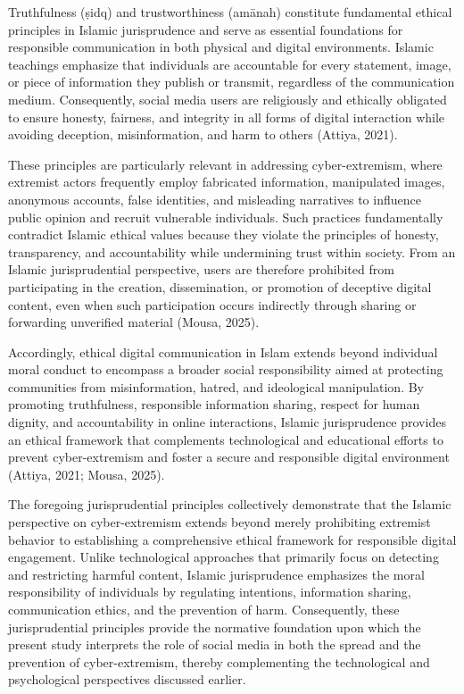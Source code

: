 \documentclass[10pt]{NSP1}
\begin{document}
\par\medskip{}\smallskip

Truthfulness (ṣidq) and trustworthiness (amānah) constitute fundamental ethical principles in Islamic jurisprudence and serve as essential foundations for responsible communication in both physical and digital environments. Islamic teachings emphasize that individuals are accountable for every statement, image, or piece of information they publish or transmit, regardless of the communication medium. Consequently, social media users are religiously and ethically obligated to ensure honesty, fairness, and integrity in all forms of digital interaction while avoiding deception, misinformation, and harm to others (Attiya, 2021).

These principles are particularly relevant in addressing cyber-extremism, where extremist actors frequently employ fabricated information, manipulated images, anonymous accounts, false identities, and misleading narratives to influence public opinion and recruit vulnerable individuals. Such practices fundamentally contradict Islamic ethical values because they violate the principles of honesty, transparency, and accountability while undermining trust within society. From an Islamic jurisprudential perspective, users are therefore prohibited from participating in the creation, dissemination, or promotion of deceptive digital content, even when such participation occurs indirectly through sharing or forwarding unverified material (Mousa, 2025).

Accordingly, ethical digital communication in Islam extends beyond individual moral conduct to encompass a broader social responsibility aimed at protecting communities from misinformation, hatred, and ideological manipulation. By promoting truthfulness, responsible information sharing, respect for human dignity, and accountability in online interactions, Islamic jurisprudence provides an ethical framework that complements technological and educational efforts to prevent cyber-extremism and foster a secure and responsible digital environment (Attiya, 2021; Mousa, 2025).

The foregoing jurisprudential principles collectively demonstrate that the Islamic perspective on cyber-extremism extends beyond merely prohibiting extremist behavior to establishing a comprehensive ethical framework for responsible digital engagement. Unlike technological approaches that primarily focus on detecting and restricting harmful content, Islamic jurisprudence emphasizes the moral responsibility of individuals by regulating intentions, information sharing, communication ethics, and the prevention of harm. Consequently, these jurisprudential principles provide the normative foundation upon which the present study interprets the role of social media in both the spread and the prevention of cyber-extremism, thereby complementing the technological and psychological perspectives discussed earlier.
\end{document}
